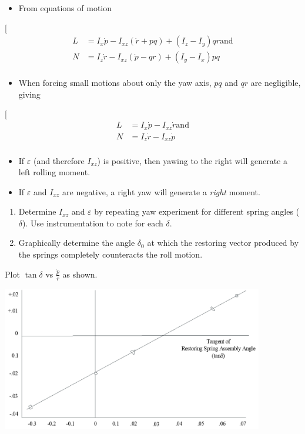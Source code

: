 \documentclass[
]{book}
\providecommand{\tightlist}{%
  \setlength{\itemsep}{0pt}\setlength{\parskip}{0pt}}
\begin{document}
\begin{itemize}
\tightlist
\item
  From equations of motion
\end{itemize}

{[}
\begin{align}
L &= I_x \dot{p} - I_{xz} \left( \dot{r} + pq \right) + \left( I_z - I_y \right) qr \text{and} \\
N &= I_z \dot{r} - I_{xz} \left( \dot{p} - qr \right) + \left( I_y - I_x \right) pq \\
\end{align}

\begin{itemize}
\tightlist
\item
  When forcing small motions about only the yaw axis, \(pq\) and \(qr\) are negligible, giving
\end{itemize}

{[}
\begin{align}
L &= I_x \dot{p} - I_{xz} \dot{r} \text{and} \\
N &=  I_z \dot{r} - I_{xz} \dot{p} \\
\end{align}

\begin{itemize}
\tightlist
\item
  If \(\varepsilon\) (and therefore \(I_{xz}\)) is positive, then yawing to the right will generate a left rolling moment.
\item
  If \(\varepsilon\) and \(I_{xz}\) are negative, a right yaw will generate a \emph{right} moment.
\end{itemize}

\begin{enumerate}
\def\labelenumi{\arabic{enumi}.}
\tightlist
\item
  Determine \(I_{xz}\) and \(\varepsilon\) by repeating yaw experiment for different spring angles (\(\delta\)). Use instrumentation to note for each \(\delta\).
\item
  Graphically determine the angle \(\delta_0\) at which the restoring vector produced by the springs completely counteracts the roll motion.
\end{enumerate}

Plot \(\tan{\delta}\) vs \(\frac{\dot{p}}{\dot{r}}\) as shown.

\includegraphics[width=4.5in,height=2.5in]{media/07/image47.png}
\end{document}
